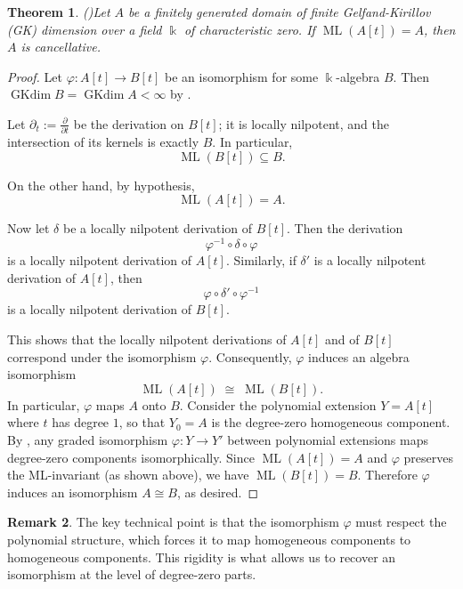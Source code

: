 \documentclass{amsart}
\theoremstyle{plain}
\newtheorem{theorem}{Theorem}
\numberwithin{theorem}{section}
\numberwithin{equation}{theorem}
\theoremstyle{definition}
\newtheorem{remark}[theorem]{Remark}
\DeclareMathOperator{\GKdim}{GKdim}
\DeclareMathOperator{\ML}{ML}
\begin{document}
\begin{theorem}(\cite[Theorem 3.3]{BellZhang2017})\label{thm:rigidity-implies-cancellation}
Let $A$ be a finitely generated domain of finite Gelfand-Kirillov (GK) dimension over a field $\Bbbk$ of characteristic zero. If $\ML(A[t]) = A$, then $A$ is cancellative.
\end{theorem}

\begin{proof}
Let $\varphi : A[t] \to B[t]$ be an isomorphism for some $\Bbbk$-algebra $B$.  
Then $\GKdim B = \GKdim A < \infty$ by \cite[Lemma 2.1(2)]{BellZhang2017}.

Let $\partial_t := \frac{\partial}{\partial t}$ be the derivation on $B[t]$; it is locally nilpotent, and the intersection of its kernels is exactly $B$.  
In particular,
\[
    \ML(B[t]) \subseteq B.
\]

On the other hand, by hypothesis,
\[
    \ML(A[t]) = A.
\]

Now let $\delta$ be a locally nilpotent derivation of $B[t]$.  
Then the derivation
\[
    \varphi^{-1} \circ \delta \circ \varphi
\]
is a locally nilpotent derivation of $A[t]$.  
Similarly, if $\delta'$ is a locally nilpotent derivation of $A[t]$, then
\[
    \varphi \circ \delta' \circ \varphi^{-1}
\]
is a locally nilpotent derivation of $B[t]$.

This shows that the locally nilpotent derivations of $A[t]$ and of $B[t]$ correspond under the isomorphism $\varphi$.  
Consequently, $\varphi$ induces an algebra isomorphism
\[
    \ML(A[t]) \;\cong\; \ML(B[t]).
\]
In particular, $\varphi$ maps $A$ onto $B$.
Consider the polynomial extension $Y = A[t]$ where $t$ has degree $1$, so that 
$Y_0 = A$ is the degree-zero homogeneous component. By 
\cite[Lemma 3.2]{BellZhang2017}, any graded isomorphism $\varphi: Y \to Y'$ 
between polynomial extensions maps degree-zero components isomorphically. 
Since $\ML(A[t]) = A$ and $\varphi$ preserves the ML-invariant (as shown above), 
we have $\ML(B[t]) = B$. Therefore $\varphi$ induces an isomorphism 
$A \cong B$, as desired.
\end{proof}

\begin{remark}
    The key technical point is that the isomorphism $\varphi$ must respect the polynomial structure, which forces it to map homogeneous components to homogeneous components. This rigidity is what allows us to recover an isomorphism at the level of degree-zero parts.
\end{remark}
\end{document}
